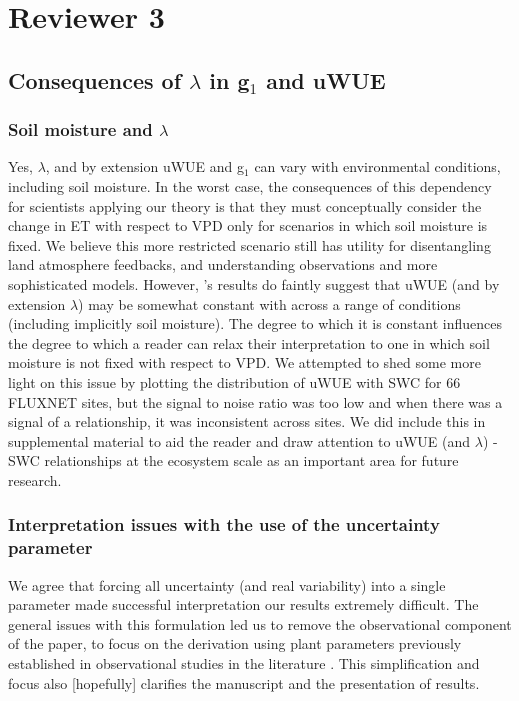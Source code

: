 \documentclass[12pt]{article}
\begin{document}
\section{Reviewer 3}

\subsection{Consequences of $\lambda$ in g$_1$ and uWUE}

\subsubsection{Soil moisture and $\lambda$}

Yes, $\lambda$, and by extension uWUE and g$_1$ can vary with
environmental conditions, including soil moisture. In the worst case,
the consequences of this dependency for scientists applying our theory
is that they must conceptually consider the change in ET with respect
to VPD only for scenarios in which soil moisture is fixed. We believe
this more restricted scenario still has utility for disentangling land
atmosphere feedbacks, and understanding observations and more
sophisticated models. However, \cite{Zhou_2015}'s results do faintly
suggest that uWUE (and by extension $\lambda$) may be somewhat
constant with across a range of conditions (including implicitly soil
moisture). The degree to which it is constant influences the degree to
which a reader can relax their interpretation to one in which soil
moisture is not fixed with respect to VPD. We attempted to shed some
more light on this issue by plotting the distribution of uWUE with SWC
for 66 FLUXNET sites, but the signal to noise ratio was too low and
when there was a signal of a relationship, it was inconsistent across
sites. We did include this in supplemental material to aid the reader
and draw attention to uWUE (and $\lambda$) - SWC relationships at the
ecosystem scale as an important area for future research.

\subsubsection{Interpretation issues with the use of the uncertainty
  parameter}

We agree that forcing all uncertainty (and real variability) into a
single parameter made successful interpretation our results extremely
difficult. The general issues with this formulation led us to remove
the observational component of the paper, to focus on the derivation
using plant parameters previously established in observational studies
in the literature \citep{Zhou_2015, Medlyn_2017}. This simplification
and focus also [hopefully] clarifies the manuscript and the
presentation of results.
\end{document}
